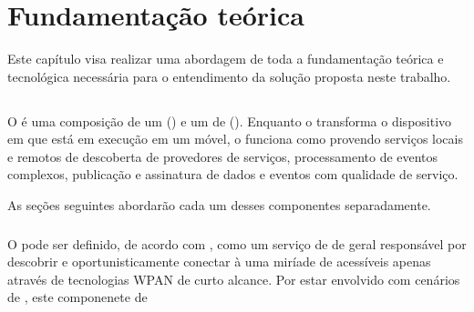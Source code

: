 \chapter{Fundamentação teórica} \label{chap:fundamentacao}

Este capítulo visa realizar uma abordagem de toda a fundamentação teórica e tecnológica necessária para o entendimento da solução proposta neste trabalho.

\section{\mhubcddl}

O \mhubcddl é uma composição de um \gateway (\mhub) e um \middleware de \iomt (\cddl). Enquanto o \mhub transforma o dispositivo \android em que está em execução em um \gateway \iot móvel, o \cddl funciona como \middleware provendo serviços locais e remotos de descoberta de provedores de serviços, processamento de eventos complexos, publicação e assinatura de dados e eventos com qualidade de serviço.

As seções seguintes abordarão cada um desses componentes separadamente.

\subsection{\mhub}

O \middleware \mhub pode ser definido, de acordo com , como um serviço de \middleware de \iomt geral responsável por descobrir e oportunisticamente conectar à uma miríade de \smartobjs acessíveis apenas através de tecnologias WPAN de curto alcance. Por estar envolvido com cenários de \iomt, este componenete de 
